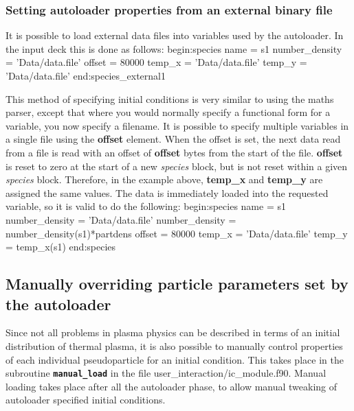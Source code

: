 \documentclass[12pt,a4paper]{article}
\newcommand{\inlinecode}[1]{{\color{warwickred} \bf\texttt{#1}}}
\newenvironment{boxverbatim}{\lboxverbatim{none}}{\endlboxverbatim}
\begin{document}
\subsubsection{Setting autoloader properties from an external binary file}
It is possible to load external data files into variables used by the
autoloader. In the input deck this is done as follows:
\begin{boxverbatim}
begin:species
   name = s1
   number_density = 'Data/data.file'
   offset = 80000
   temp_x = 'Data/data.file'
   temp_y = 'Data/data.file'
end:species_external1
\end{boxverbatim}

This method of specifying initial conditions is very similar to using the
maths parser, except that
where you would normally specify a functional form for a variable, you now
specify a filename.  It is possible to specify
multiple variables in a single file using the {\bf offset} element. When the
offset is set, the next data read from a file is read with an offset of {\bf
offset} bytes from the start of the file. {\bf offset} is reset to zero at the
start of a new {\it species} block, but is not reset within a given
{\it species} block. Therefore, in the example above, {\bf temp\_x}
and {\bf temp\_y} are assigned the same values. The data is immediately loaded
into the requested variable, so it is valid to do the following:
\begin{boxverbatim}
begin:species
   name = s1
   number_density = 'Data/data.file'
   number_density = number_density(s1)*partdens
   offset = 80000
   temp_x = 'Data/data.file'
   temp_y = temp_x(s1)
end:species
\end{boxverbatim}


\subsection{Manually overriding particle parameters set by the autoloader}
\label{sec:manualload}

Since not all problems in plasma physics can be described in terms of an
initial distribution of thermal plasma, it is also possible to manually
control properties of each individual pseudoparticle for an initial
condition. This takes place in the subroutine \inlinecode{manual\_load} in the
file user\_interaction/ic\_module.f90. Manual loading takes place after
all the autoloader phase, to allow manual tweaking of autoloader specified
initial conditions.
\end{document}
